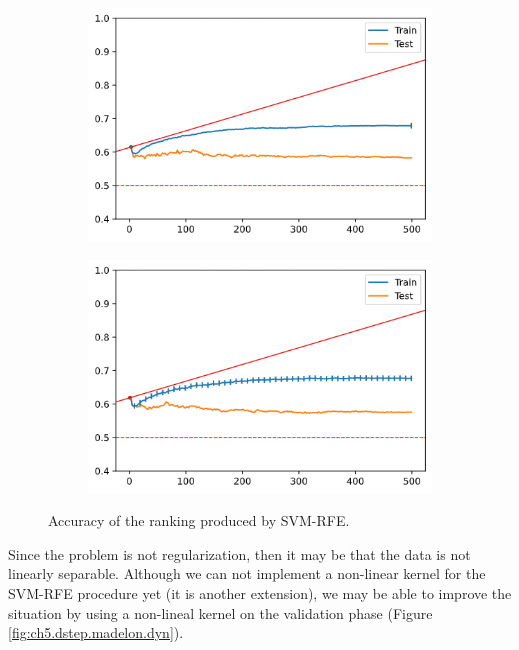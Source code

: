 \begin{figure}[h]
    \centering
    \begin{subfigure}[b]{0.4\linewidth}
        \includegraphics[width=\linewidth]{img/ch5/dstep/madelon-lin1.png}
    \end{subfigure}
    \begin{subfigure}[b]{0.4\linewidth}
        \includegraphics[width=\linewidth]{img/ch5/dstep/madelon-lin2.png}
    \end{subfigure}
    \caption{Accuracy of the ranking produced by SVM-RFE.}
    \label{fig:ch5.dstep.madelon.lin}
\end{figure}

Since the problem is not regularization, then it may be that the data is not linearly separable. Although we can not implement a non-linear kernel for the SVM-RFE procedure yet (it is another extension), we may be able to improve the situation by using a non-lineal kernel on the validation phase (Figure \ref{fig:ch5.dstep.madelon.dyn}).

